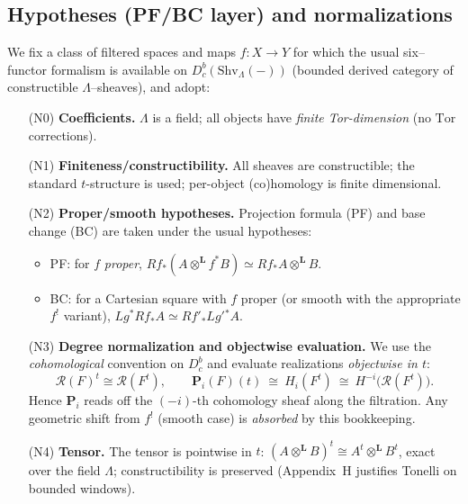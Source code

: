\documentclass[11pt]{article}
\numberwithin{equation}{section}
\theoremstyle{definition}
\begin{document}
\setcounter{subsection}{0}
\renewcommand\thesubsection{N.\arabic{subsection}}
\makeatletter
\renewcommand\@seccntformat[1]{\csname the#1\endcsname.\quad}
\makeatother

\subsection{Hypotheses (PF/BC layer) and normalizations}
\label{N:hyp}
We fix a class of filtered spaces and maps \(f:X\to Y\) for which the usual six–functor formalism is available on
\(D^b_c(\mathrm{Shv}_\Lambda(-))\) (bounded derived category of constructible \(\Lambda\)–sheaves), and adopt:

\begin{itemize}\itemsep0.35em
  \item[(N0)] \textbf{Coefficients.} \(\Lambda\) is a field; all objects have \emph{finite Tor-dimension} (no \(\mathrm{Tor}\) corrections).
  \item[(N1)] \textbf{Finiteness/constructibility.} All sheaves are constructible; the standard \(t\)-structure is used; per-object (co)homology is finite dimensional.
  \item[(N2)] \textbf{Proper/smooth hypotheses.} Projection formula (PF) and base change (BC) are taken under the usual hypotheses:
  \begin{itemize}\itemsep0.1em
    \item PF: for \(f\) \emph{proper}, \(Rf_\ast(A\otimes^\mathbf{L} f^\ast B)\simeq Rf_\ast A\otimes^\mathbf{L} B\).
    \item BC: for a Cartesian square with \(f\) proper (or smooth with the appropriate \(f^!\) variant),
    \(Lg^\ast Rf_\ast A \simeq Rf'_\ast Lg'{}^\ast A\).
  \end{itemize}
  \item[(N3)] \textbf{Degree normalization and objectwise evaluation.}
  We use the \emph{cohomological} convention on \(D^b_c\) and evaluate realizations \emph{objectwise in \(t\)}:
  \[
     \mathcal{R}(F)^t \cong \mathcal{R}(F^t),\qquad
       \mathbf{P}_i(F)(t)\ \cong\ H_i(F^t)\ \cong\ H^{-i}\!\big(\mathcal{R}(F^t)\big).
  \]
  Hence \(\mathbf{P}_i\) reads off the \((-i)\)-th cohomology sheaf along the filtration.
  Any geometric shift from \(f^!\) (smooth case) is \emph{absorbed} by this bookkeeping.
  \item[(N4)] \textbf{Tensor.} The tensor is pointwise in \(t\):
  \((A\otimes^\mathbf{L} B)^t \cong A^t\otimes^\mathbf{L} B^t\), exact over the field \(\Lambda\);
  constructibility is preserved (Appendix~H justifies Tonelli on bounded windows).
\end{itemize}
\end{document}
